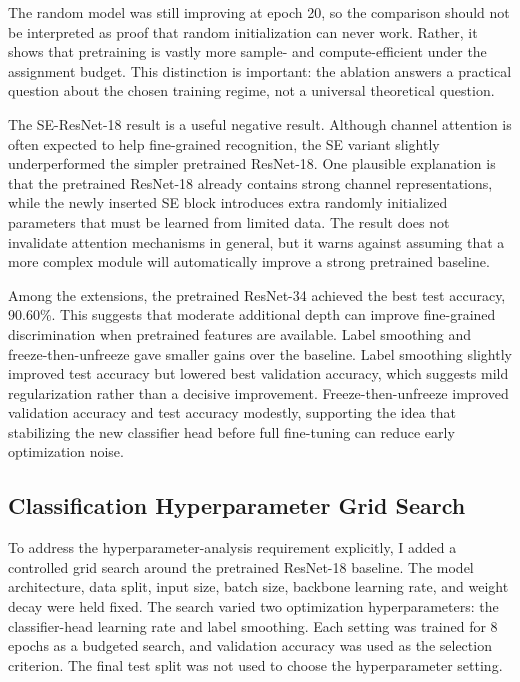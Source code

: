 \documentclass[10pt,twocolumn]{article}
\begin{document}
The random model was still improving at epoch 20, so the comparison should not be interpreted as proof that random initialization can never work. Rather, it shows that pretraining is vastly more sample- and compute-efficient under the assignment budget. This distinction is important: the ablation answers a practical question about the chosen training regime, not a universal theoretical question.

The SE-ResNet-18 result is a useful negative result. Although channel attention is often expected to help fine-grained recognition, the SE variant slightly underperformed the simpler pretrained ResNet-18. One plausible explanation is that the pretrained ResNet-18 already contains strong channel representations, while the newly inserted SE block introduces extra randomly initialized parameters that must be learned from limited data. The result does not invalidate attention mechanisms in general, but it warns against assuming that a more complex module will automatically improve a strong pretrained baseline.

Among the extensions, the pretrained ResNet-34 achieved the best test accuracy, 90.60\%. This suggests that moderate additional depth can improve fine-grained discrimination when pretrained features are available. Label smoothing and freeze-then-unfreeze gave smaller gains over the baseline. Label smoothing slightly improved test accuracy but lowered best validation accuracy, which suggests mild regularization rather than a decisive improvement. Freeze-then-unfreeze improved validation accuracy and test accuracy modestly, supporting the idea that stabilizing the new classifier head before full fine-tuning can reduce early optimization noise.

\subsection{Classification Hyperparameter Grid Search}

To address the hyperparameter-analysis requirement explicitly, I added a controlled grid search around the pretrained ResNet-18 baseline. The model architecture, data split, input size, batch size, backbone learning rate, and weight decay were held fixed. The search varied two optimization hyperparameters: the classifier-head learning rate and label smoothing. Each setting was trained for 8 epochs as a budgeted search, and validation accuracy was used as the selection criterion. The final test split was not used to choose the hyperparameter setting.
\end{document}
